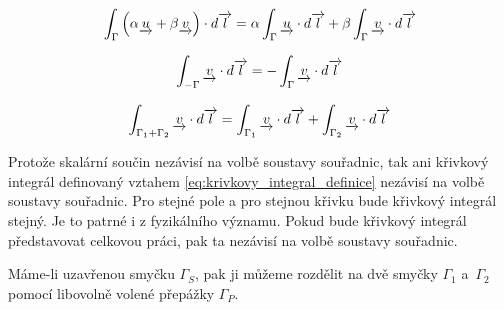 \begin{equation}
\label{eq:krivkovy_integral_linearita}
\begin{split}
\int_{\Gamma} \left(\alpha \underrightarrow{u} + \beta \underrightarrow{v}\right) \cdot d\overrightarrow{l} = \alpha \int_{\Gamma} \underrightarrow{u} \cdot d\overrightarrow{l} + \beta \int_{\Gamma} \underrightarrow{v} \cdot d\overrightarrow{l}
\end{split}
\end{equation}

\begin{equation}
\label{eq:krivkovy_integral_opacny}
\begin{split}
\int_{-\Gamma} \underrightarrow{v} \cdot d\overrightarrow{l} = -\int_{\Gamma} \underrightarrow{v} \cdot d\overrightarrow{l}
\end{split}
\end{equation}

\begin{equation}
\label{eq:krivkovy_integral_soucet}
\begin{split}
\int_{\Gamma_1 + \Gamma_2} \underrightarrow{v} \cdot d\overrightarrow{l} = \int_{\Gamma_1} \underrightarrow{v} \cdot d\overrightarrow{l} + \int_{\Gamma_2} \underrightarrow{v} \cdot d\overrightarrow{l}
\end{split}
\end{equation}

Protože skalární součin nezávisí na volbě soustavy souřadnic, tak ani křivkový integrál definovaný vztahem \eqref{eq:krivkovy_integral_definice} nezávisí na volbě soustavy souřadnic. Pro stejné pole a pro stejnou křivku bude křivkový integrál stejný. Je to patrné i z fyzikálního významu. Pokud bude křivkový integrál představovat celkovou práci, pak ta nezávisí na volbě soustavy souřadnic.

Máme-li uzavřenou smyčku \(\Gamma_S\), pak ji můžeme rozdělit na dvě smyčky \(\Gamma_1\) a~\(\Gamma_2\) pomocí libovolně volené přepážky \(\Gamma_P\).


